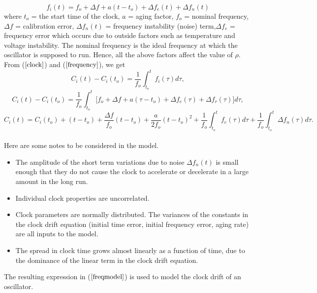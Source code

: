 \documentclass[a4paper,10pt]{report}
\begin{document}
\begin{equation}
f_i(t) = f_o + \Delta f + a(t-t_o) + \Delta f_e(t) + \Delta f_n(t)
\label{frequency}
\end{equation}
where \newline $t_o$ = the start time of the clock, \newline $a$ = aging factor, \newline $f_o$ = nominal frequency, \newline $\Delta
f$ = calibration error, \newline $\Delta f_n(t)$ = frequency instability (noise) term,\newline $\Delta f_e$ = frequency error which occurs
due to outside factors such as temperature and voltage instability.\newline
The nominal frequency is the ideal frequency at which the oscillator is supposed to run. Hence, all the above factors affect the value of $\rho$. From ($\ref{clock}$) and ($\ref{frequency}$), we get
\begin{equation}
C_i(t) - C_i(t_o) = \dfrac{1}{f_o} \int^{t}_{t_o}f_i(\tau)d\tau ,
\end{equation}
\begin{equation}
C_i(t) - C_i(t_o) = \dfrac{1}{f_o} \int^{t}_{t_o}{[f_o + \Delta f + a(\tau-t_o)  } + \Delta f_e(\tau) + \Delta f_r(\tau)]d\tau ,
\label{fasika}
\end{equation}
\begin{equation}
C_i(t) =  C_i(t_o) + (t-t_o) +\dfrac{\Delta f}{f_o}(t-t_o) + \dfrac{a}{2f_o}(t-t_o)^2 + \dfrac{1}{f_o}\int^{t}_{t_o}{f_e(\tau)d\tau} +
\dfrac{1}{f_o}\int^{t}_{t_o}{\Delta f_n(\tau)d\tau} .
\label{freqmodel}
\end{equation}
\paragraph*{}
Here are some notes to be considered in the model.
\begin{itemize}
\item The amplitude of the short term variations due to noise $\Delta f_n(t)$ is small enough that they do not cause the clock to accelerate or decelerate in a large amount in the long run.
\item Individual clock properties are uncorrelated.
\item Clock parameters are normally distributed. The variances of the constants in the clock drift equation (initial time error,
initial frequency error, aging rate) are all inputs to the model.
\item The spread in clock time grows almost linearly as a function of time, due to the dominance of the linear term in the clock drift equation.
\end{itemize}
The resulting expression in ($\ref{freqmodel}$) is used to model the clock drift of an oscillator.
\end{document}
